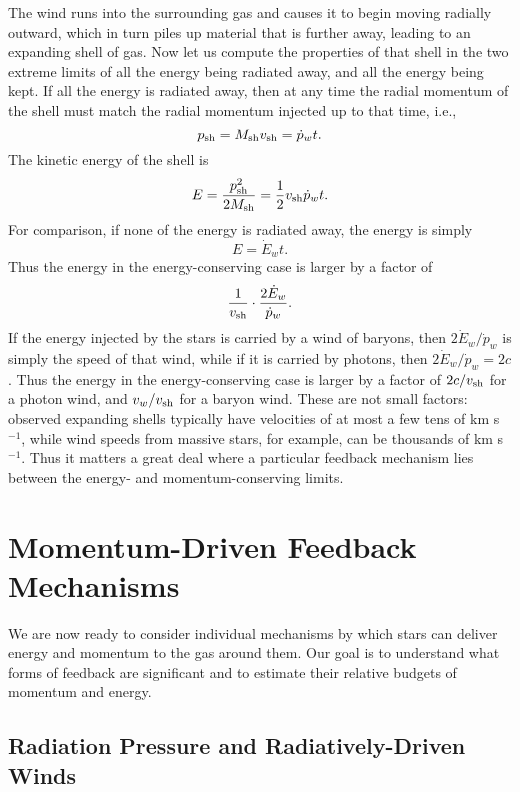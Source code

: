 The wind runs into the surrounding gas and causes it to begin moving radially outward, which in turn piles up material that is further away, leading to an expanding shell of gas. Now let us compute the properties of that shell in the two extreme limits of all the energy being radiated away, and all the energy being kept. If all the energy is radiated away, then at any time the radial momentum of the shell must match the radial momentum injected up to that time, i.e.,
\begin{equation}
p_{\rm sh} = M_{\rm sh} v_{\rm sh} = \dot{p}_w t.
\end{equation}
The kinetic energy of the shell is
\begin{equation}
E = \frac{p_{\rm sh}^2}{2 M_{\rm sh}} = \frac{1}{2} v_{\rm sh} \dot{p}_w t.
\end{equation} 
For comparison, if none of the energy is radiated away, the energy is simply
\begin{equation}
E = \dot{E}_w t.
\end{equation}
Thus the energy in the energy-conserving case is larger by a factor of
\begin{equation}
\frac{1}{v_{\rm sh}} \cdot \frac{2\dot{E}_w}{\dot{p}_w}.
\end{equation}
If the energy injected by the stars is carried by a wind of baryons, then $2\dot{E}_w/\dot{p}_w$ is simply the speed of that wind, while if it is carried by photons, then $2\dot{E}_w/\dot{p}_w = 2 c$. Thus the energy in the energy-conserving case is larger by a factor of $2c/v_{\rm sh}$ for a photon wind, and $v_w/v_{\rm sh}$ for a baryon wind. These are not small factors: observed expanding shells typically have velocities of at most a few tens of km s$^{-1}$, while wind speeds from massive stars, for example, can be thousands of km s$^{-1}$. Thus it matters a great deal where a particular feedback mechanism lies between the energy- and momentum-conserving limits.

\section{Momentum-Driven Feedback Mechanisms}

We are now ready to consider individual mechanisms by which stars can deliver energy and momentum to the gas around them. Our goal is to understand what forms of feedback are significant and to estimate their relative budgets of momentum and energy.

\subsection{Radiation Pressure and Radiatively-Driven Winds}

